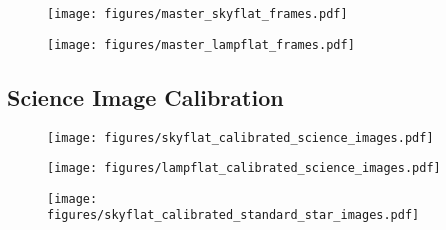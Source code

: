 \documentclass[twocolumn]{aastex631}
\begin{document}
\begin{figure}[ht!]
    \begin{centering}
        \texttt{[image: figures/master\_skyflat\_frames.pdf]}
        \caption{}
        \label{fig:master_skyflat}
    \end{centering}
\end{figure}

\begin{figure}[ht!]
    \begin{centering}
        \texttt{[image: figures/master\_lampflat\_frames.pdf]}
        \caption{}
        \label{fig:master_lampflat}
    \end{centering}
\end{figure}

\subsection{Science Image Calibration}
\label{subsec:im_cal}


\begin{figure}[ht!]
    \begin{centering}
        \texttt{[image: figures/skyflat\_calibrated\_science\_images.pdf]}
        \caption{}
        \label{fig:master_dark}
    \end{centering}
\end{figure}

\begin{figure}[ht!]
    \begin{centering}
        \texttt{[image: figures/lampflat\_calibrated\_science\_images.pdf]}
        \caption{}
        \label{fig:master_dark}
    \end{centering}
\end{figure}

\begin{figure}[ht!]
    \begin{centering}
        \texttt{[image: figures/skyflat\_calibrated\_standard\_star\_images.pdf]}
        \caption{}
        \label{fig:master_dark}
    \end{centering}
\end{figure}
\end{document}
